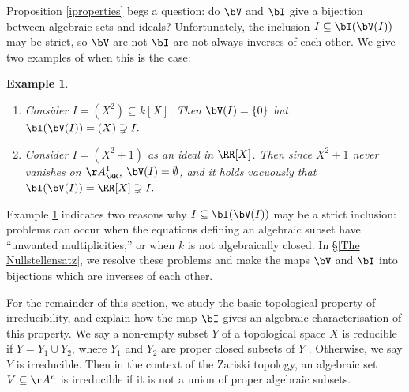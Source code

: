 \documentclass[12pt]{amsart}
\theoremstyle{plain}
\newtheorem{example}[theorem]{Example}
\begin{document}
Proposition \ref{iproperties} begs a question: do $\bV$ and $\bI$ give a bijection between algebraic sets and ideals?
Unfortunately, the inclusion $I \subseteq \bI(\bV(I))$ may be strict, so $\bV$ are not $\bI$ are not always inverses of each other.
We give two examples of when this is the case:

\begin{example}\label{inclfails}
\begin{enumerate}
\item
Consider $I = (X^2) \subseteq k[X]$.
Then $\bV(I) = \{0\}$ but $\bI(\bV(I)) = (X) \supsetneq I.$

\item
Consider $I = (X^2+1)$ as an ideal in $\RR[X]$.
Then since $X^2+1$ never vanishes on $\AA^1_\RR$, $\bV(I) = \emptyset$, and it holds vacuously that $\bI(\bV(I)) = \RR[X] \supsetneq I.$
\end{enumerate}
\end{example}

Example \ref{inclfails} indicates two reasons why $I \subseteq \bI(\bV(I))$ may be a strict inclusion:
problems can occur when the equations defining an algebraic subset have ``unwanted multiplicities,'' or when $k$ is not algebraically closed.
In \S \ref{The Nullstellensatz}, we resolve these problems and make the maps $\bV$ and $\bI$ into bijections which are inverses of each other.

For the remainder of this section, we study the basic topological property of irreducibility, and explain how the map $\bI$ gives an algebraic characterisation of this property.
We say a non-empty subset $Y$ of a topological space $X$ is reducible if $Y = Y_1 \cup Y_2$, where $Y_1$ and $Y_2$ are proper closed subsets of $Y$ \cite[Chapter I]{Hartshorne77}.
Otherwise, we say $Y$ is irreducible.
Then in the context of the Zariski topology, an algebraic set $V \subseteq \AA^n$ is irreducible if it is not a union of proper algebraic subsets.
\end{document}
